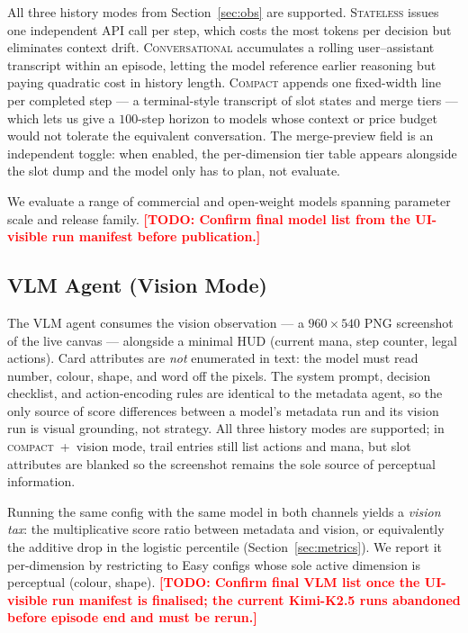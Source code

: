 \documentclass[11pt]{article}
\newcommand{\todo}[1]{\textcolor{red}{\textbf{[TODO: #1]}}}
\begin{document}
All three history modes from Section~\ref{sec:obs} are supported.
\textsc{Stateless} issues one independent API call per step, which costs
the most tokens per decision but eliminates context drift.
\textsc{Conversational} accumulates a rolling user--assistant transcript
within an episode, letting the model reference earlier reasoning but
paying quadratic cost in history length. \textsc{Compact} appends one
fixed-width line per completed step --- a terminal-style transcript of
slot states and merge tiers --- which lets us give a $100$-step horizon to
models whose context or price budget would not tolerate the equivalent
conversation. The merge-preview field is an independent toggle: when
enabled, the per-dimension tier table appears alongside the slot dump and
the model only has to plan, not evaluate.

We evaluate a range of commercial and open-weight models spanning
parameter scale and release family. \todo{Confirm final model list from
the UI-visible run manifest before publication.}

\subsection{VLM Agent (Vision Mode)}
\label{sec:vlm-agent}

The VLM agent consumes the vision observation --- a $960{\times}540$ PNG
screenshot of the live canvas --- alongside a minimal HUD (current mana,
step counter, legal actions). Card attributes are \emph{not} enumerated in
text: the model must read number, colour, shape, and word off the pixels.
The system prompt, decision checklist, and action-encoding rules are
identical to the metadata agent, so the only source of score differences
between a model's metadata run and its vision run is visual grounding,
not strategy. All three history modes are supported; in
\textsc{compact}~+~vision mode, trail entries still list actions and
mana, but slot attributes are blanked so the screenshot remains the sole
source of perceptual information.

Running the same config with the same model in both channels yields a
\emph{vision tax}: the multiplicative score ratio between metadata and
vision, or equivalently the additive drop in the logistic percentile
(Section~\ref{sec:metrics}). We report it per-dimension by restricting to
Easy configs whose sole active dimension is perceptual (colour, shape).
\todo{Confirm final VLM list once the UI-visible run manifest is
finalised; the current Kimi-K2.5 runs abandoned before episode end and
must be rerun.}
\end{document}
